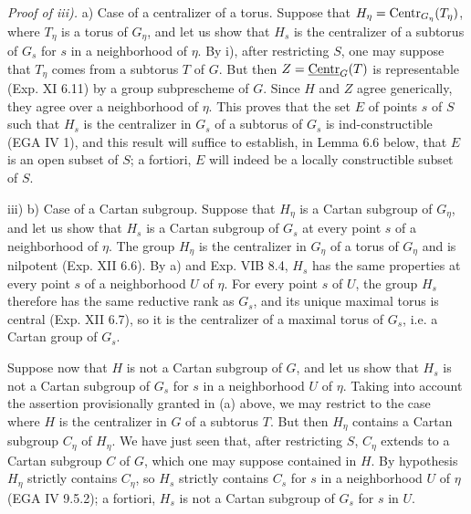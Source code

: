 \par\noindent\emph{Proof of iii).} a) Case of a centralizer of a torus. Suppose that $H_\eta=\operatorname{Centr}_{G_\eta}(T_\eta)$, where $T_\eta$ is a torus of $G_\eta$, and let us show that $H_s$ is the centralizer of a subtorus of $G_s$ for $s$ in a neighborhood of $\eta$. By i), after restricting $S$, one may suppose that $T_\eta$ comes from a subtorus $T$ of $G$. But then $Z=\underline{\mathrm{Centr}}_G(T)$ is representable (Exp. XI 6.11) by a group subprescheme of $G$. Since $H$ and $Z$ agree generically, they agree over a neighborhood of $\eta$. This proves that the set $E$ of points $s$ of $S$ such that $H_s$ is the centralizer in $G_s$ of a subtorus of $G_s$ is ind-constructible (EGA IV 1), and this result will suffice to establish, in Lemma 6.6 below, that $E$ is an open subset of $S$; a fortiori, $E$ will indeed be a locally constructible subset of $S$.

\noindent iii) b) Case of a Cartan subgroup. Suppose that $H_\eta$ is a Cartan subgroup of $G_\eta$, and let us show that $H_s$ is a Cartan subgroup of $G_s$ at every point $s$ of a neighborhood of $\eta$. The group $H_\eta$ is the centralizer in $G_\eta$ of a torus of $G_\eta$ and is nilpotent (Exp. XII 6.6). By a) and Exp. VIB 8.4, $H_s$ has the same properties at every point $s$ of a neighborhood $U$ of $\eta$. For every point $s$ of $U$, the group $H_s$ therefore has the same reductive rank as $G_s$, and its unique maximal torus is central (Exp. XII 6.7), so it is the centralizer of a maximal torus of $G_s$, i.e. a Cartan group of $G_s$.

Suppose now that $H$ is not a Cartan subgroup of $G$, and let us show that $H_s$ is not a Cartan subgroup of $G_s$ for $s$ in a neighborhood $U$ of $\eta$. Taking into account the assertion provisionally granted in (a) above, we may restrict to the case where $H$ is the centralizer in $G$ of a subtorus $T$. But then $H_\eta$ contains a Cartan subgroup $C_\eta$ of $H_\eta$. We have just seen that, after restricting $S$, $C_\eta$ extends to a Cartan subgroup $C$ of $G$, which one may suppose contained in $H$. By hypothesis $H_\eta$ strictly contains $C_\eta$, so $H_s$ strictly contains $C_s$ for $s$ in a neighborhood $U$ of $\eta$ (EGA IV 9.5.2); a fortiori, $H_s$ is not a Cartan subgroup of $G_s$ for $s$ in $U$.

